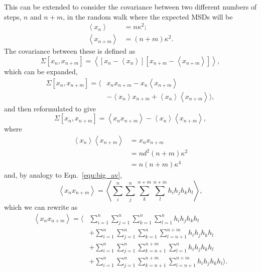 \documentclass[reprint,superscriptaddress,nobibnotes,amsmath,amssymb,aps,prx,hidelinks]{revtex4-2}
\newcommand{\oMSDn}{\ensuremath{x_n}}
\newcommand{\oMSDm}{\ensuremath{x_{n + m}}}
\newcommand{\moMSDn}{\ensuremath{\left<\oMSDn\right>}}
\newcommand{\moMSDm}{\ensuremath{\left<\oMSDm\right>}}
\begin{document}
This can be extended to consider the covariance between two different numbers of steps, $n$ and $n+m$, in the random walk where the expected MSDs will be
%
\begin{equation}
    \begin{aligned}
        \moMSDn &= n\kappa^2; \\
        \moMSDm &= (n+m)\kappa^2.
    \end{aligned}
\end{equation}
%
The covariance between these is defined as
%
\begin{equation}
    \Sigma \left[\oMSDn, \oMSDm \right] = \left<{\left[{\oMSDn - \moMSDn}\right] \left[{\oMSDm - \moMSDm}\right]}\right>, 
\end{equation}
%
which can be expanded,
%
\begin{equation}
    \begin{aligned}
        \Sigma \left[\oMSDn, \oMSDm \right] = \big\langle & \oMSDn\oMSDm - \oMSDn\moMSDm \\
        & - \moMSDn\oMSDm + \moMSDn\moMSDm\big\rangle,
    \end{aligned}
\end{equation}
%
and then reformulated to give
%
\begin{equation}
    \Sigma \left[\oMSDn, \oMSDm \right] = \left<\oMSDn\oMSDm\right> - \moMSDn\moMSDm,
    \label{equ:pair}
\end{equation}
%
where 
%
\begin{equation}
    \begin{aligned}
        \moMSDn\moMSDm &= \oMSDn\oMSDm \\
                       &= nd^2(n+m)\kappa^2 \\
                       &= n(n+m)\kappa^4
    \end{aligned}
\end{equation}
%
and, by analogy to Eqn.~\ref{equ:big_av},
%
\begin{equation}
    \left<\oMSDn\oMSDm\right> = \left<\sum_i^n\sum_j^n\sum_k^{n+m}\sum_l^{n+m} h_i h_j h_k h_l\right>,
\end{equation}
%
which we can rewrite as
%
\begin{equation}
    \begin{aligned}
        \left<\oMSDn\oMSDm\right> = \Bigg\langle & \sum_{i=1}^n\sum_{j=1}^n\sum_{k=1}^{n}\sum_{l=1}^{n} h_i h_j h_k h_l \\
        & + \sum_{i=1}^n\sum_{j=1}^n\sum_{k=1}^{n}\sum_{l=n+1}^{n+m} h_i h_j h_k h_l \\
        & + \sum_{i=1}^n\sum_{j=1}^n\sum_{k=n+1}^{n+m}\sum_{l=1}^{n} h_i h_j h_k h_l \\
        & + \sum_{i=1}^n\sum_{j=1}^n\sum_{k=n+1}^{n+m}\sum_{l=n+1}^{n+m} h_i h_j h_k h_l \Bigg\rangle.
    \end{aligned}
    \label{equ:vbig}
\end{equation}
\end{document}
